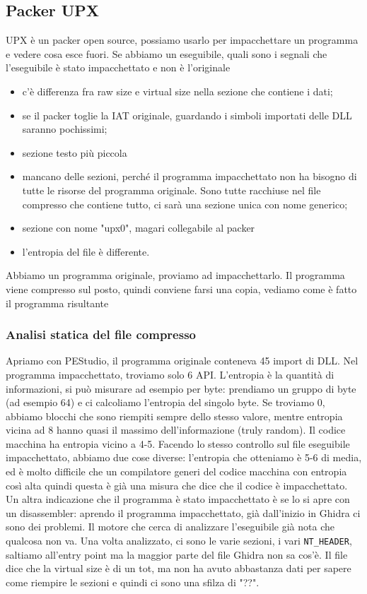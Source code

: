 \documentclass[12pt, oneside]{extbook}
\begin{document}
\subsection{Packer UPX}
UPX è un packer open source, possiamo usarlo per impacchettare un programma e vedere cosa esce fuori. Se abbiamo un eseguibile, quali sono i segnali che l'eseguibile è stato impacchettato e non è l'originale
\begin{itemize}
\item c'è differenza fra raw size e virtual size nella sezione che contiene i dati;
\item se il packer toglie la IAT originale, guardando i simboli importati delle DLL saranno pochissimi;
\item sezione testo più piccola
\item mancano delle sezioni, perché il programma impacchettato non ha bisogno di tutte le risorse del programma originale. Sono tutte racchiuse nel file compresso che contiene tutto, ci sarà una sezione unica con nome generico;
\item sezione con nome "upx0", magari collegabile al packer
\item l'entropia del file è differente.
\end{itemize}
Abbiamo un programma originale, proviamo ad impacchettarlo. Il programma viene compresso sul posto, quindi conviene farsi una copia, vediamo come è fatto il programma risultante
\subsubsection{Analisi statica del file compresso}
Apriamo con PEStudio, il programma originale conteneva 45 import di DLL. Nel programma impacchettato, troviamo solo 6 API. L'entropia è la quantità di informazioni, si può misurare ad esempio per byte: prendiamo un gruppo di byte (ad esempio 64) e ci calcoliamo l'entropia del singolo byte. Se troviamo 0, abbiamo blocchi che sono riempiti sempre dello stesso valore, mentre entropia vicina ad 8 hanno quasi il massimo dell'informazione (truly random). Il codice macchina ha entropia vicino a 4-5. Facendo lo stesso controllo sul file eseguibile impacchettato, abbiamo due cose diverse: l'entropia che otteniamo è 5-6 di media, ed è molto difficile che un compilatore generi del codice macchina con entropia così alta quindi questa è già una misura che dice che il codice è impacchettato.\\Un altra indicazione che il programma è stato impacchettato è se lo si apre con un disassembler: aprendo il programma impacchettato, già dall'inizio in Ghidra ci sono dei problemi. Il motore che cerca di analizzare l'eseguibile già nota che qualcosa non va. Una volta analizzato, ci sono le varie sezioni, i vari \texttt{NT\_HEADER}, saltiamo all'entry point ma la maggior parte del file Ghidra non sa cos'è. Il file dice che la virtual size è di un tot, ma non ha avuto abbastanza dati per sapere come riempire le sezioni e quindi ci sono una sfilza di "??".
\end{document}
